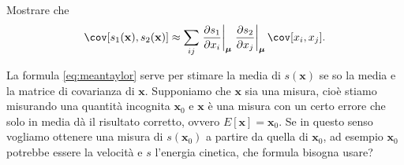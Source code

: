 \begin{exercise}
	Mostrare che
	\begin{equation*}
		\cov[s_1(\mathbf x), s_2(\mathbf x)] \approx
		\sum_{ij}
		\left.\frac{\partial s_1}{\partial x_i}\right|_{\boldsymbol\mu}
		\left.\frac{\partial s_2}{\partial x_j}\right|_{\boldsymbol\mu}
		\cov[x_i,x_j].
	\end{equation*}
\end{exercise}

\begin{exercise}
    La formula \eqref{eq:meantaylor} serve per stimare la media di $s(\mathbf
    x)$ se so la media e la matrice di covarianza di $\mathbf x$. Supponiamo
    che $\mathbf x$ sia una misura, cioè stiamo misurando una quantità
    incognita $\mathbf x_0$ e $\mathbf x$ è una misura con un certo errore che
    solo in media dà il risultato corretto, ovvero $E[\mathbf x] = \mathbf
    x_0$. Se in questo senso vogliamo ottenere una misura di $s(\mathbf x_0)$ a
    partire da quella di $\mathbf x_0$, ad esempio $\mathbf x_0$ potrebbe
    essere la velocità e $s$ l'energia cinetica, che formula bisogna usare?
\end{exercise}

